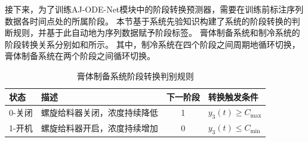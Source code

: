 接下来，为了训练AJ-ODE-Net模块中的阶段转换预测器，需要在训练前标注序列数据各时间点处的所属阶段。
本节基于系统先验知识构建了系统的阶段转换的判断规则，并基于此自动地为序列数据赋予阶段标签。
膏体制备系统和制冷系统的阶段转换关系分别如和所示。
其中，制冷系统在四个阶段之间周期地循环切换，膏体制备系统在两个阶段之间循环切换。
\begin{table}[]
    \centering
    \caption{膏体制备系统阶段转换判别规则}
    \label{tab:paste_dfa}
    \begin{tabular}{llcl}
    \toprule
       状态                  &    描述             & 下一阶段 & 转换触发条件                                   \\ 
       \hline
    0-关闭                       & 螺旋给料器关闭，浓度持续降低                             & 1          & $y_3(t)\geq C_{\max}$                                \\
    1-开机                       & 螺旋给料器开启，浓度持续增加                                   & 0          & $y_3(t)\leq C_{\min}$                                \\
    \bottomrule
    \end{tabular}
\end{table}

